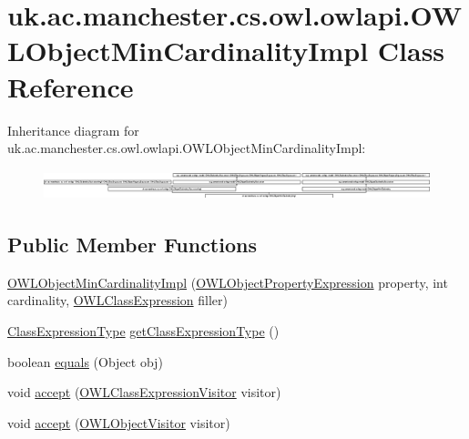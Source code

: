 \hypertarget{classuk_1_1ac_1_1manchester_1_1cs_1_1owl_1_1owlapi_1_1_o_w_l_object_min_cardinality_impl}{\section{uk.\-ac.\-manchester.\-cs.\-owl.\-owlapi.\-O\-W\-L\-Object\-Min\-Cardinality\-Impl Class Reference}
\label{classuk_1_1ac_1_1manchester_1_1cs_1_1owl_1_1owlapi_1_1_o_w_l_object_min_cardinality_impl}
}
Inheritance diagram for uk.\-ac.\-manchester.\-cs.\-owl.\-owlapi.\-O\-W\-L\-Object\-Min\-Cardinality\-Impl\-:\begin{figure}[H]
\begin{center}
\leavevmode
\includegraphics[height=0.882585cm]{classuk_1_1ac_1_1manchester_1_1cs_1_1owl_1_1owlapi_1_1_o_w_l_object_min_cardinality_impl}
\end{center}
\end{figure}
\subsection*{Public Member Functions}
\begin{DoxyCompactItemize}
\item 
\hyperlink{classuk_1_1ac_1_1manchester_1_1cs_1_1owl_1_1owlapi_1_1_o_w_l_object_min_cardinality_impl_a37003bc942b692b175e530ca09b8b0b8}{O\-W\-L\-Object\-Min\-Cardinality\-Impl} (\hyperlink{interfaceorg_1_1semanticweb_1_1owlapi_1_1model_1_1_o_w_l_object_property_expression}{O\-W\-L\-Object\-Property\-Expression} property, int cardinality, \hyperlink{interfaceorg_1_1semanticweb_1_1owlapi_1_1model_1_1_o_w_l_class_expression}{O\-W\-L\-Class\-Expression} filler)
\item 
\hyperlink{enumorg_1_1semanticweb_1_1owlapi_1_1model_1_1_class_expression_type}{Class\-Expression\-Type} \hyperlink{classuk_1_1ac_1_1manchester_1_1cs_1_1owl_1_1owlapi_1_1_o_w_l_object_min_cardinality_impl_a49cd98eaf962d4683c511eea746d9098}{get\-Class\-Expression\-Type} ()
\item 
boolean \hyperlink{classuk_1_1ac_1_1manchester_1_1cs_1_1owl_1_1owlapi_1_1_o_w_l_object_min_cardinality_impl_acd73353ada68cf7e24a048f18b342763}{equals} (Object obj)
\item 
void \hyperlink{classuk_1_1ac_1_1manchester_1_1cs_1_1owl_1_1owlapi_1_1_o_w_l_object_min_cardinality_impl_acf272dd34d1c49f4f41f4e2a53624003}{accept} (\hyperlink{interfaceorg_1_1semanticweb_1_1owlapi_1_1model_1_1_o_w_l_class_expression_visitor}{O\-W\-L\-Class\-Expression\-Visitor} visitor)
\item 
void \hyperlink{classuk_1_1ac_1_1manchester_1_1cs_1_1owl_1_1owlapi_1_1_o_w_l_object_min_cardinality_impl_ac574dab475591ff6e37b7ab00b9b35d4}{accept} (\hyperlink{interfaceorg_1_1semanticweb_1_1owlapi_1_1model_1_1_o_w_l_object_visitor}{O\-W\-L\-Object\-Visitor} visitor)
\end{DoxyCompactItemize}
